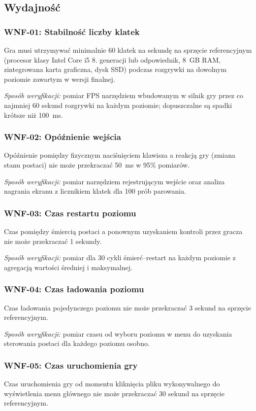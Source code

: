 \subsection{Wydajność}

\subsubsection*{WNF-01: Stabilność liczby klatek}
Gra musi utrzymywać minimalnie 60 klatek na sekundę na sprzęcie referencyjnym (procesor klasy Intel Core i5 8. generacji lub odpowiednik, 8~GB RAM, zintegrowana karta graficzna, dysk SSD) podczas rozgrywki na dowolnym poziomie zawartym w wersji finalnej.

\textit{Sposób weryfikacji:} pomiar FPS narzędziem wbudowanym w silnik gry przez co najmniej 60 sekund rozgrywki na każdym poziomie; dopuszczalne są spadki krótsze niż 100~ms.

\subsubsection*{WNF-02: Opóźnienie wejścia}
Opóźnienie pomiędzy fizycznym naciśnięciem klawisza a reakcją gry (zmiana stanu postaci) nie może przekraczać 50~ms w 95\% pomiarów.

\textit{Sposób weryfikacji:} pomiar narzędziem rejestrującym wejście oraz analiza nagrania ekranu z licznikiem klatek dla 100 prób parowania.

\subsubsection*{WNF-03: Czas restartu poziomu}
Czas pomiędzy śmiercią postaci a ponownym uzyskaniem kontroli przez gracza nie może przekraczać 1 sekundy.

\textit{Sposób weryfikacji:} pomiar dla 30 cykli śmierć--restart na każdym poziomie z agregacją wartości średniej i maksymalnej.

\subsubsection*{WNF-04: Czas ładowania poziomu}
Czas ładowania pojedynczego poziomu nie może przekraczać 3 sekund na sprzęcie referencyjnym.

\textit{Sposób weryfikacji:} pomiar czasu od wyboru poziomu w menu do uzyskania sterowania postaci dla każdego poziomu osobno.

\subsubsection*{WNF-05: Czas uruchomienia gry}
Czas uruchomienia gry od momentu kliknięcia pliku wykonywalnego do wyświetlenia menu głównego nie może przekraczać 30 sekund na sprzęcie referencyjnym.

